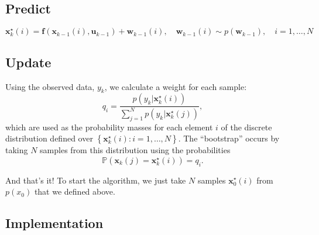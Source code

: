 \documentclass[11pt]{article}\usepackage[]{graphicx}\usepackage[]{color}
\newcommand{\bx}{\boldsymbol{x}}
\newcommand{\bu}{\boldsymbol{u}}
\newcommand{\bw}{\boldsymbol{w}}
\newcommand{\bfn}{\boldsymbol{f}}
\newcommand{\pr}{\mathbb{P}}
\renewcommand{\Pr}[1]{\pr\left(#1\right)}
\begin{document}
\subsection{Predict}

\begin{equation}
  \label{eq:predict_step}
  \bx_k^\star(i) =  \bfn\left(\bx_{k-1}(i), \bu_{k-1} \right) +  \bw_{k-1}(i),\quad
  \bw_{k-1}(i) \sim p\left(\bw_{k-1}\right),\quad
  i = 1, \ldots, N
\end{equation}


\subsection{Update}

Using the observed data, $y_k$, we calculate a weight for each sample:
\begin{equation}
  \label{eq:normalisation_weight}
  q_i = \frac{
    p\left(y_k | \bx_k^\star (i)\right)
  }{
    \sum_{j = 1}^N p\left(y_k | \bx_k^\star (j)\right)
  },
\end{equation}
which are used as the probability masses for each element $i$ of the discrete distribution defined over 
$\left\{\bx_k^\star (i): i = 1,\ldots,N\right\}$.
The ``bootstrap'' occurs by taking $N$ samples from this distribution using the probabilities
\begin{equation}
  \label{eq:boot_probs}
  \Pr{\bx_k(j) = \bx_k^\star(i)} = q_i.
\end{equation}


And that's it! To start the algorithm, we just take $N$ samples $\bx_0^\star(i)$ from
$p\left(x_0\right)$ that we defined above.



\subsection{Implementation}
\end{document}
